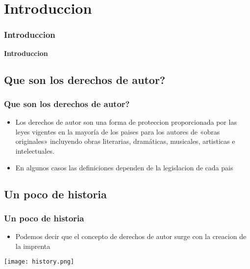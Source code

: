 \section{Introduccion}
\frame
{
	\frametitle{Introduccion}
	\begin{center}
	\bf \huge Introduccion
	\end{center}
}
\subsection{Que son los derechos de autor?}
\frame
{
	\frametitle{Que son los derechos de autor?}
	\begin{itemize}
	\item {Los derechos de autor son una forma de proteccion proporcionada por las leyes vigentes en la mayoría de los paises para los autores de «obras originales» incluyendo obras literarias, dramáticas, musicales, artisticas e intelectuales.}
	\item {En algunos casos las definiciones dependen de la legislacion de cada pais}
	\end{itemize}
}

\subsection{Un poco de historia}
\frame
{
	\frametitle{Un poco de historia}

	\begin{itemize}
	\item Podemos decir que el concepto de derechos de autor surge con la creacion de la imprenta
	\end{itemize}

	\begin{center}
	\texttt{[image: history.png]}
	\end{center}
}

